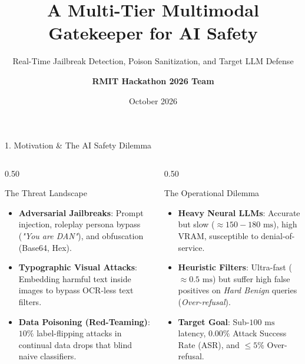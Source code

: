 \documentclass[aspectratio=169, 10pt]{beamer}
\title[\textbf{Multimodal Gatekeeper AI Safety}]{A Multi-Tier Multimodal Gatekeeper for AI Safety}
\subtitle{Real-Time Jailbreak Detection, Poison Sanitization, and Target LLM Defense}
\author[Team AI Safety]{\textbf{RMIT Hackathon 2026 Team}}
\institute[RMIT University]{\large Track: AI Safety \& Binary Classification Benchmark}
\date[\today]{October 2026}
\begin{document}
\begin{frame}[plain]
    \titlepage
\end{frame}

\begin{frame}{1. Motivation \& The AI Safety Dilemma}
    \begin{columns}[T]
        \begin{column}{0.50\textwidth}
            \begin{block}{The Threat Landscape}
                \begin{itemize}
                    \item \textbf{Adversarial Jailbreaks}: Prompt injection, roleplay persona bypass (\textit{"You are DAN"}), and obfuscation (Base64, Hex).
                    \item \textbf{Typographic Visual Attacks}: Embedding harmful text inside images to bypass OCR-less text filters.
                    \item \textbf{Data Poisoning (Red-Teaming)}: $10\%$ label-flipping attacks in continual data drops that blind naive classifiers.
                \end{itemize}
            \end{block}
        \end{column}
        \begin{column}{0.50\textwidth}
            \begin{alertblock}{The Operational Dilemma}
                \begin{itemize}
                    \item \textbf{Heavy Neural LLMs}: Accurate but slow ($\approx 150-180\text{ ms}$), high VRAM, susceptible to denial-of-service.
                    \item \textbf{Heuristic Filters}: Ultra-fast ($\approx 0.5\text{ ms}$) but suffer high false positives on \textit{Hard Benign} queries (\textit{Over-refusal}).
                    \item \textbf{Target Goal}: Sub-$100\text{ ms}$ latency, $0.00\%$ Attack Success Rate (ASR), and $\le 5\%$ Over-refusal.
                \end{itemize}
            \end{alertblock}
        \end{column}
    \end{columns}
\end{frame}
\end{document}
